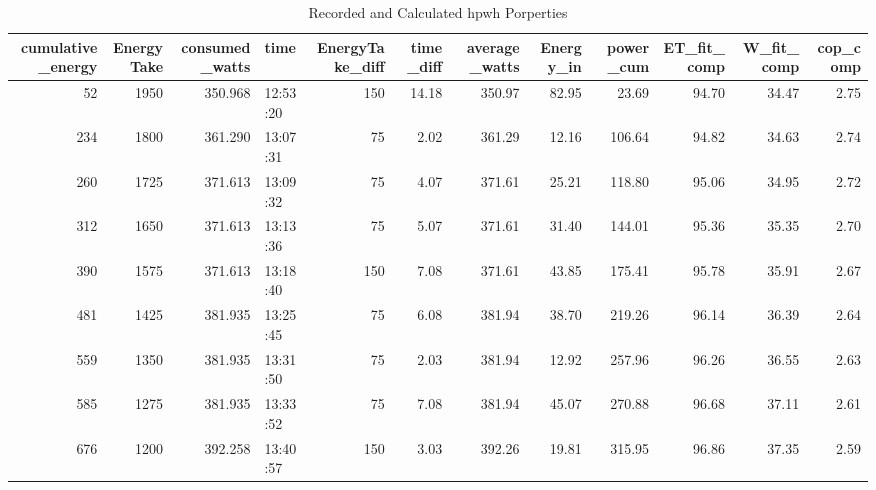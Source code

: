 \begin{table}[ht!]
\caption{Recorded and Calculated \gls{hpwh} Porperties}
\begin{adjustbox}{max width=\textwidth}
\begin{tabular}{|r|r|r|l|r|r|r|r|r|r|r|r|}
\hline
 cumulative\_energy &  EnergyTake &  consumed\_watts &     time &  EnergyTake\_diff &  time\_diff &  average\_watts &  Energy\_in &  power\_cum &  ET\_fit\_comp &  W\_fit\_comp &  cop\_comp \\ \hline

                52 &               1950 &         350.968 & 12:53:20 &              150 &      14.18 &         350.97 &      82.95 &      23.69 &        94.70 &       34.47 &      2.75 \\ \hline
               234 &               1800 &         361.290 & 13:07:31 &               75 &       2.02 &         361.29 &      12.16 &     106.64 &        94.82 &       34.63 &      2.74 \\ \hline
               260 &               1725 &         371.613 & 13:09:32 &               75 &       4.07 &         371.61 &      25.21 &     118.80 &        95.06 &       34.95 &      2.72 \\ \hline
               312 &               1650 &         371.613 & 13:13:36 &               75 &       5.07 &         371.61 &      31.40 &     144.01 &        95.36 &       35.35 &      2.70 \\ \hline
               390 &               1575 &         371.613 & 13:18:40 &              150 &       7.08 &         371.61 &      43.85 &     175.41 &        95.78 &       35.91 &      2.67 \\ \hline
               481 &               1425 &         381.935 & 13:25:45 &               75 &       6.08 &         381.94 &      38.70 &     219.26 &        96.14 &       36.39 &      2.64 \\ \hline
               559 &               1350 &         381.935 & 13:31:50 &               75 &       2.03 &         381.94 &      12.92 &     257.96 &        96.26 &       36.55 &      2.63 \\ \hline
               585 &               1275 &         381.935 & 13:33:52 &               75 &       7.08 &         381.94 &      45.07 &     270.88 &        96.68 &       37.11 &      2.61 \\ \hline
               676 &               1200 &         392.258 & 13:40:57 &              150 &       3.03 &         392.26 &      19.81 &     315.95 &        96.86 &       37.35 &      2.59 \\ \hline

\end{tabular}
\end{adjustbox}
\end{table}
